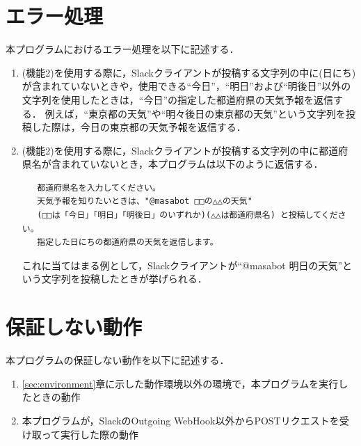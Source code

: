 \documentclass[12pt]{jsarticle}
\begin{document}
\section{エラー処理}
本プログラムにおけるエラー処理を以下に記述する．
\begin{enumerate}
\item (機能2)を使用する際に，Slackクライアントが投稿する文字列の中に(日にち)が含まれていないときや，使用できる``今日''，``明日''および``明後日''以外の文字列を使用したときは，``今日''の指定した都道府県の天気予報を返信する．
  例えば，``東京都の天気''や``明々後日の東京都の天気''という文字列を投稿した際は，今日の東京都の天気予報を返信する．

  \item (機能2)を使用する際に，Slackクライアントが投稿する文字列の中に都道府県名が含まれていないとき，本プログラムは以下のように返信する．
\begin{verbatim}
   都道府県名を入力してください。
   天気予報を知りたいときは、"@masabot □□の△△の天気" 
   (□□は「今日」「明日」「明後日」のいずれか)(△△は都道府県名) と投稿してください。
   指定した日にちの都道府県の天気を返信します。
\end{verbatim}
これに当てはまる例として，Slackクライアントが``@masabot 明日の天気''という文字列を投稿したときが挙げられる．
\end{enumerate}

\section{保証しない動作}
本プログラムの保証しない動作を以下に記述する． 
\begin{enumerate}
\item \ref{sec:environment}章に示した動作環境以外の環境で，本プログラムを実行したときの動作
\item 本プログラムが，SlackのOutgoing WebHook以外からPOSTリクエストを受け取って実行した際の動作
  
\end{enumerate}



\end{document}
